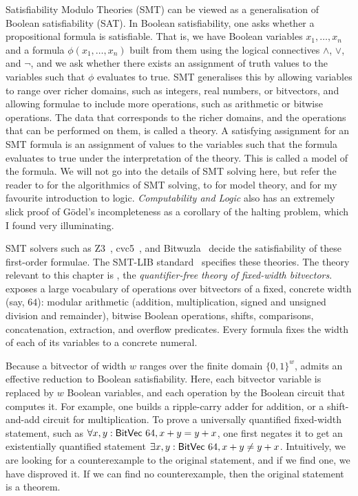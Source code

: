 Satisfiability Modulo Theories (SMT) can be viewed as a generalisation of Boolean satisfiability (SAT).
In Boolean satisfiability, one asks whether a propositional formula is satisfiable.
That is, we have Boolean variables $x_1, \dots, x_n$ and a formula $\phi(x_1, \dots, x_n)$ built from them using the logical connectives $\land$, $\lor$, and $\lnot$,
and we ask whether there exists an assignment of truth values to the variables such that $\phi$ evaluates to true.
SMT generalises this by allowing variables to range over richer domains,
such as integers, real numbers, or bitvectors, and allowing formulae to include more operations, such as arithmetic or bitwise operations.
The data that corresponds to the richer domains, and the operations that can be performed on them, is called a theory.
A satisfying assignment for an SMT formula is an assignment of values to the variables such that the formula evaluates to true under the interpretation of the theory.
This is called a model of the formula. We will not go into the details of SMT solving here,
but refer the reader to \citet{kroening2016decision} for the algorithmics of SMT solving,
to \citet{hodges1997shorter} for model theory, and \citet{boolos2002computability} for my favourite introduction to logic.
\emph{Computability and Logic} also has an extremely slick proof of G\"odel's incompleteness as a corollary
of the halting problem, which I found very illuminating.

SMT solvers such as Z3~\citep{de2008z3},
cvc5~\citep{barrett2011cvc4,barbosa2022cvc5}, and Bitwuzla~\citep{niemetz2023bitwuzla}
decide the satisfiability of these first-order formulae. The SMT-LIB standard~\citep{barrett2010smt,smtlib}
specifies these theories. The theory relevant to this chapter is \qfbv{}, the
\emph{quantifier-free theory of fixed-width bitvectors}. \qfbv{} exposes a
large vocabulary of operations over bitvectors of a fixed, concrete width (say, $64$):
modular arithmetic (addition, multiplication, signed and unsigned division and
remainder), bitwise Boolean operations, shifts, comparisons, concatenation, extraction, and overflow predicates.
Every \qfbv{} formula fixes the width of each of its variables to a concrete numeral.

Because a bitvector of width $w$ ranges over the finite domain $\{0,1\}^w$,
\qfbv{} admits an effective reduction to Boolean satisfiability.
Here, each bitvector variable is replaced by $w$ Boolean variables,
and each operation by the Boolean circuit that computes it.
For example, one builds a ripple-carry adder for addition,
or a shift-and-add circuit for multiplication.
To prove a universally quantified fixed-width statement, such as $\forall x, y : \mathsf{BitVec}~{64}, x + y = y + x$,
one first negates it to get an existentially quantified statement $\exists x, y : \mathsf{BitVec}~{64}, x + y \neq y + x$.
Intuitively, we are looking for a counterexample to the original statement, and if we find one, we have disproved it.
If we can find no counterexample, then the original statement is a theorem.

